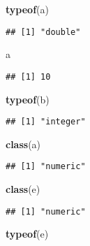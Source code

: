 \documentclass[
]{article}
\newenvironment{Shaded}{\begin{snugshade}}{\end{snugshade}}
\newcommand{\FunctionTok}[1]{\textcolor[rgb]{0.13,0.29,0.53}{\textbf{#1}}}
\newcommand{\NormalTok}[1]{#1}
\begin{document}
\begin{Shaded}
\begin{Highlighting}[]
\FunctionTok{typeof}\NormalTok{(a)}
\end{Highlighting}
\end{Shaded}

\begin{verbatim}
## [1] "double"
\end{verbatim}

\begin{Shaded}
\begin{Highlighting}[]
\NormalTok{a}
\end{Highlighting}
\end{Shaded}

\begin{verbatim}
## [1] 10
\end{verbatim}

\begin{Shaded}
\begin{Highlighting}[]
\FunctionTok{typeof}\NormalTok{(b)}
\end{Highlighting}
\end{Shaded}

\begin{verbatim}
## [1] "integer"
\end{verbatim}

\begin{Shaded}
\begin{Highlighting}[]
\FunctionTok{class}\NormalTok{(a)}
\end{Highlighting}
\end{Shaded}

\begin{verbatim}
## [1] "numeric"
\end{verbatim}

\begin{Shaded}
\begin{Highlighting}[]
\FunctionTok{class}\NormalTok{(e)}
\end{Highlighting}
\end{Shaded}

\begin{verbatim}
## [1] "numeric"
\end{verbatim}

\begin{Shaded}
\begin{Highlighting}[]
\FunctionTok{typeof}\NormalTok{(e)}
\end{Highlighting}
\end{Shaded}
\end{document}
